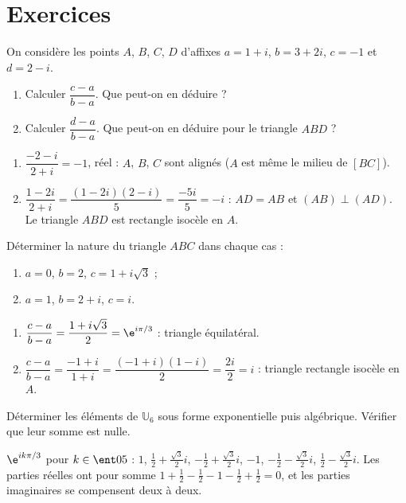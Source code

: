 \mxnewpage
\section{Exercices}
\begin{exercise}
On considère les points $A$, $B$, $C$, $D$ d'affixes $a=1+i$, $b=3+2i$, $c=-1$ et $d=2-i$.
\begin{enumerate}
\item Calculer $\dfrac{c-a}{b-a}$. Que peut-on en déduire ?
\item Calculer $\dfrac{d-a}{b-a}$. Que peut-on en déduire pour le triangle $ABD$ ?
\end{enumerate}
\end{exercise}
\begin{solution}
\begin{enumerate}
\item $\dfrac{-2-i}{2+i}=-1$, réel : $A$, $B$, $C$ sont alignés ($A$ est même le milieu de $[BC]$).
\item $\dfrac{1-2i}{2+i}=\dfrac{(1-2i)(2-i)}5=\dfrac{-5i}5=-i$ : $AD=AB$ et $(AB)\perp(AD)$. Le triangle $ABD$ est rectangle isocèle en $A$.
\end{enumerate}
\end{solution}

\begin{exercise}
Déterminer la nature du triangle $ABC$ dans chaque cas :
\begin{enumerate}
\item $a=0$, $b=2$, $c=1+i\sqrt3$ ;
\item $a=1$, $b=2+i$, $c=i$.
\end{enumerate}
\end{exercise}
\begin{solution}
\begin{enumerate}
\item $\dfrac{c-a}{b-a}=\dfrac{1+i\sqrt3}2=\e^{i\pi/3}$ : triangle équilatéral.
\item $\dfrac{c-a}{b-a}=\dfrac{-1+i}{1+i}=\dfrac{(-1+i)(1-i)}2=\dfrac{2i}{2}=i$ : triangle rectangle isocèle en $A$.
\end{enumerate}
\end{solution}

\begin{exercise}
Déterminer les éléments de $\mathbb U_6$ sous forme exponentielle puis algébrique. Vérifier que leur somme est nulle.
\end{exercise}
\begin{solution}
$\e^{ik\pi/3}$ pour $k\in\ent05$ : $1$, $\frac12+\frac{\sqrt3}2i$, $-\frac12+\frac{\sqrt3}2i$, $-1$, $-\frac12-\frac{\sqrt3}2i$, $\frac12-\frac{\sqrt3}2i$. Les parties réelles ont pour somme $1+\frac12-\frac12-1-\frac12+\frac12=0$, et les parties imaginaires se compensent deux à deux.
\end{solution}

